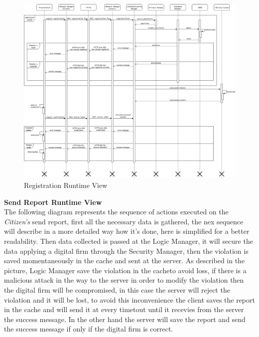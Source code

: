 \documentclass{article}
\begin{document}
\begin{figure}[H]
    \centering
    \includegraphics[scale=0.3]{img/sequence_diagrams/registration_sequence.png}
    \caption{Registration Runtime View}
\end{figure}  
\clearpage
\textbf{Send Report Runtime View}\\
The following diagram represents the sequence of actions executed on the \textit{Citizen's} send report, 
first all the necessary data is gathered, the nex sequence will describe in a more detailed way how it's 
done, here is simplified for a better readability. Then data collected is passed at the Logic Manager, 
it will secure the data applying a digital firm through the Security Manager, then the violation is 
saved momentaneously in the cache and sent at the server. As described in the picture, Logic Manager 
save the violation in the cacheto avoid loss, if there is a malicious attack in the way to the server 
in order to modify the violation then the digital firm will be compromised, in this case the server 
will reject the violation and it will be lost, to avoid this inconvenience the client saves the report 
in the cache and will send it at every timetout until it recevies from the server the success message. 
In the other hand the server will save the report and send the success message if only if the digital 
firm is correct. 
\end{document}
